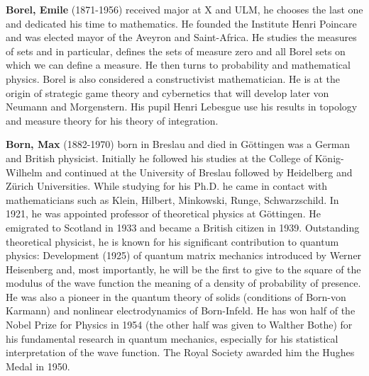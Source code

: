 \textbf{Borel, Emile} (1871-1956) received major at X and ULM, he chooses the last one and dedicated his time to mathematics. He founded the Institute Henri Poincare and was elected mayor of the Aveyron and Saint-Africa. He studies the measures of sets and in particular, defines the sets of measure zero and all Borel sets on which we can define a measure. He then turns to probability and mathematical physics. Borel is also considered a constructivist mathematician. He is at the origin of strategic game theory and cybernetics that will develop later von Neumann and Morgenstern. His pupil Henri Lebesgue use his results in topology and measure theory for his theory of integration.

\textbf{Born, Max }(1882-1970) born in Breslau and died in Göttingen was a German and British physicist. Initially he followed his studies at the College of König-Wilhelm and continued at the University of Breslau followed by Heidelberg and Zürich Universities. While studying for his Ph.D. he came in contact with mathematicians such as Klein, Hilbert, Minkowski, Runge, Schwarzschild. In 1921, he was appointed professor of theoretical physics at Göttingen. He emigrated to Scotland in 1933 and became a British citizen in 1939. Outstanding theoretical physicist, he is known for his significant contribution to quantum physics: Development (1925) of quantum matrix mechanics introduced by Werner Heisenberg and, most importantly, he will be the first to give to the square of the modulus of the wave function the meaning of a density of probability of presence. He was also a pioneer in the quantum theory of solids (conditions of Born-von Karmann) and nonlinear electrodynamics of Born-Infeld. He has won half of the Nobel Prize for Physics in 1954 (the other half was given to Walther Bothe) for his fundamental research in quantum mechanics, especially for his statistical interpretation of the wave function. The Royal Society awarded him the Hughes Medal in 1950.

